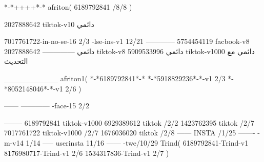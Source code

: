 *-*++++*-*
afriton(
6189792841 /8/8
)

2027888642 tiktok-v10
دائمي

7017761722-in-no-se-16 2/3
-lse-ins-v1 12/21
------------
5754454119 facbook-v8
دائمي
--------------
2027888642 tiktok-v8
دائمي
5909533996 tiktok-v1000
دائمي مع التحديث

__________
afriton1(
*-*6189792841*-*
*-*5918829236*-*-v1 2/3
*-*8052148046*-*-v1 2/6
)

------
------------
-face-15 2/2

--------
6189792841 tiktok-v1000
6929389612 tiktok /2/2
1423762395 tiktok /2/7
7017761722 tiktok-v1000 /2/7
1676036020 tiktok /2/8
------
 INSTA /1/25
-------
-m-v14 1/14
-----
userinsta 11/16
------
-twe/10/29
Trind(
6189792841-Trind-v1 
8176980717-Trind-v1 2/6
1534317836-Trind-v1 2/7
)
